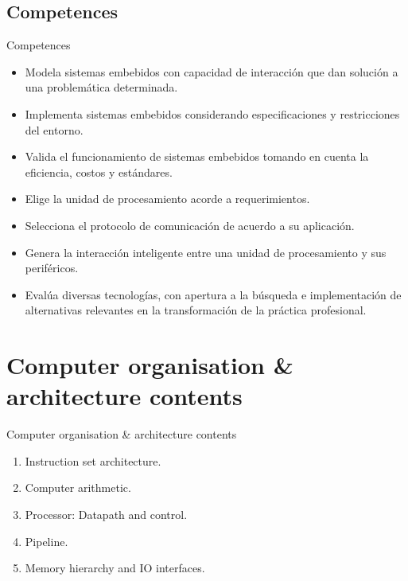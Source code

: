 \documentclass[]{slides}
\begin{document}
\subsection{Competences}
\begin{frame}{Competences}
  \begin{itemize}
    \item {} Modela sistemas embebidos con capacidad de interacción que dan solución a una problemática determinada.
    \item {} Implementa sistemas embebidos considerando especificaciones y restricciones del entorno.
    \item {} Valida el funcionamiento de sistemas embebidos tomando en cuenta la eficiencia, costos y estándares.
    \item {} Elige la unidad de procesamiento acorde a requerimientos.
    \item {} Selecciona el protocolo de comunicación de acuerdo a su aplicación.
    \item {} Genera la interacción inteligente entre una unidad de procesamiento y sus periféricos.
    \item {} Evalúa diversas tecnologías, con apertura a la búsqueda e implementación de alternativas relevantes en la transformación de la práctica profesional.
  \end{itemize}
\end{frame}

\section{Computer organisation \& architecture contents}
\begin{frame}{Computer organisation \& architecture contents}
  \begin{enumerate}
    \item Instruction set architecture.
    \item Computer arithmetic.
    \item Processor: Datapath and control.
    \item Pipeline.
    \item Memory hierarchy and \ac{IO} interfaces.
  \end{enumerate}
\end{frame}
\end{document}
